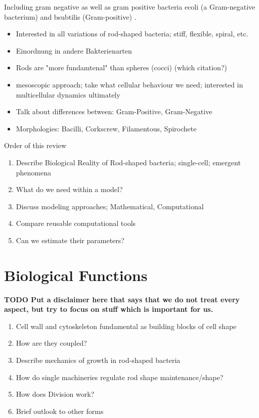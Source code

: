 Including gram negative as well as gram positive bacteria \ac{ecoli} (a Gram-negative
bacterium) and \ac{bsubtilis} (Gram-positive) \cite{Chang2014}.

\begin{itemize}
    \item Interested in all variations of rod-shaped bacteria; stiff, flexible, spiral, etc.
    \item Einordnung in andere Bakterienarten
    \item Rods are "more fundamtenal" than spheres (cocci) (which citation?)
    \item mesoscopic approach; take what cellular behaviour we need; interested in multicellular
        dynamics ultimately
    \item Talk about differences between: Gram-Positive, Gram-Negative
    \item Morphologies: Bacilli, Corkscrew, Filamentous, Spirochete
\end{itemize}

Order of this review
\begin{enumerate}
    \item Describe Biological Reality of Rod-shaped bacteria; single-cell; emergent phenomena
    \item What do we need within a model?
    \item Discuss modeling approaches; Mathematical, Computational
    \item Compare reusable computational tools
    \item Can we estimate their parameters?
\end{enumerate}

\section{Biological Functions}
\textbf{TODO Put a disclaimer here that says that we do not treat every aspect, but try to focus on
stuff which is important for us.}

\begin{enumerate}
    \item Cell wall and cytoskeleton fundamental as building blocks of cell shape
    \item How are they coupled?
    \item Describe mechanics of growth in rod-shaped bacteria
    \item How do single machineries regulate rod shape maintenance/shape?
    \item How does Division work?
    \item Brief outlook to other forms
\end{enumerate}

